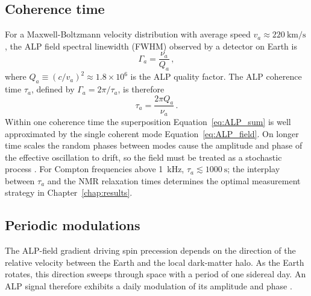 \subsection{Coherence time}\label{sec:theory:MWALP:coherence}  %

For a Maxwell-Boltzmann velocity distribution with average speed $v_a \approx \SI{220}{\km\per\s}$ \cite{Evans2019_SHMRefined}, the ALP field spectral linewidth (FWHM) observed by a detector on Earth is
\begin{equation}
    \Gamma_a = \dfrac{\nu_a}{Q_a}
    \,,\label{eq:Gamma_a_Qa}
\end{equation}
where $Q_a \equiv (c/v_a)^2 \approx 1.8\times10^6$ is the ALP quality factor. The ALP coherence time $\tau_a$, defined by $\Gamma_a = 2\pi/\tau_a$, is therefore
\begin{equation}
    \tau_a = \dfrac{2\pi Q_a}{\nu_a}
    \,.
    \label{eq:taua}
\end{equation}
Within one coherence time the superposition Equation~\eqref{eq:ALP_sum} is well approximated by the single coherent mode Equation~\eqref{eq:ALP_field}. On longer time scales the random phases between modes cause the amplitude and phase of the effective oscillation to drift, so the field must be treated as a stochastic process \cite{Centers2021Stochastic}. For Compton frequencies above \SI{1}{\kHz}, $\tau_a \lesssim \SI{1000}{\second}$; the interplay between $\tau_a$ and the NMR relaxation times determines the optimal measurement strategy in Chapter~\ref{chap:results}.




\subsection{Periodic modulations}\label{sec:theory:MWALP:modulations}


The ALP-field gradient driving spin precession depends on the direction of the relative velocity between the Earth and the local dark-matter halo. As the Earth rotates, this direction sweeps through space with a period of one sidereal day. An ALP signal therefore exhibits a daily modulation of its amplitude and phase \cite{Gramolin2022Feb_SpectralSignatures}.


